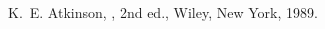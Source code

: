 \begin{thebibliography}{100}


K.~E. Atkinson,
, 2nd ed.,
\newblock Wiley, New York, 1989.


\end{thebibliography}
